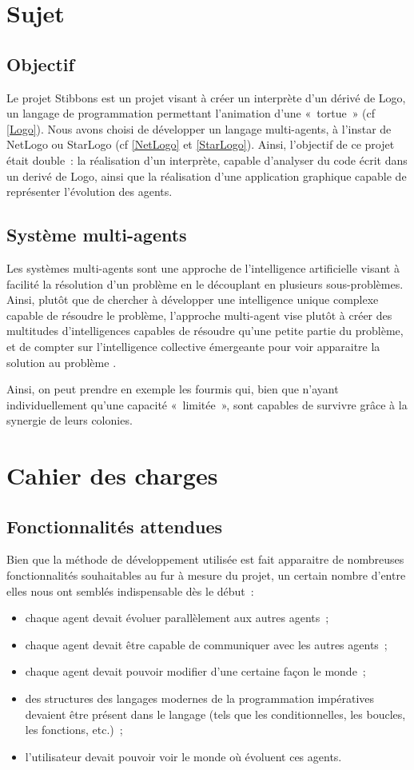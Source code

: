 \section{Sujet}
	\subsection{Objectif}
	Le projet Stibbons est un projet visant à créer un interprète d'un dérivé de Logo, un langage de programmation permettant l'animation d'une «~tortue~» (cf \ref{Logo}). Nous avons choisi de développer un langage multi-agents, à l'instar de NetLogo ou StarLogo (cf \ref{NetLogo} et \ref{StarLogo}). Ainsi, l'objectif de ce projet était double~: la réalisation d'un interprète, capable d'analyser du code écrit dans un derivé de Logo, ainsi que la réalisation d'une application graphique capable de représenter l'évolution des agents.
	
	\subsection{Système multi-agents}
	Les systèmes multi-agents sont une approche de l'intelligence artificielle visant à facilité la résolution d'un problème en le découplant en plusieurs sous-problèmes. Ainsi, plutôt que de chercher à développer une intelligence unique complexe capable de résoudre le problème, l'approche multi-agent vise plutôt à créer des multitudes d'intelligences capables de résoudre qu'une petite partie du problème, et de compter sur l'intelligence collective émergeante pour voir apparaitre la solution au problème \cite{sma}.

	Ainsi, on peut prendre en exemple les fourmis qui, bien que n'ayant individuellement qu'une capacité «~limitée~», sont capables de survivre grâce à la synergie de leurs colonies.

\section{Cahier des charges}
	\subsection{Fonctionnalités attendues}
	Bien que la méthode de développement utilisée est fait apparaitre de nombreuses fonctionnalités souhaitables au fur à mesure du projet, un certain nombre d'entre elles nous ont semblés indispensable dès le début~:
	\begin{itemize}
		\item chaque agent devait évoluer parallèlement aux autres agents~;
		\item chaque agent devait être capable de communiquer avec les autres agents~;
		\item chaque agent devait pouvoir modifier d'une certaine façon le monde~;
		\item des structures des langages modernes de la programmation impératives devaient être présent dans le langage (tels que les conditionnelles, les boucles, les fonctions, etc.)~;
		\item l'utilisateur devait pouvoir voir le monde où évoluent ces agents.
	\end{itemize}
